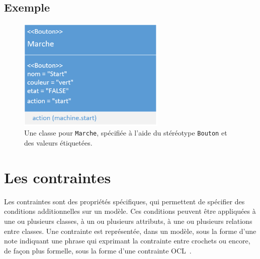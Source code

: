 
\subsection*{Exemple}
%
\begin{figure}[H]
    \begin{center}
    \includegraphics[width=7cm]{10_img/chap4/start.PNG}
    \caption{Une classe pour \texttt{Marche}, spécifiée à l'aide du stéréotype \texttt{Bouton} et des valeurs \'etiquet\'ees.}
    \label{fig.uml_marche}
    \end{center}
\end{figure}






\section{Les contraintes}
Les contraintes sont des propriétés spécifiques, qui permettent de sp\'ecifier des conditions additionnelles sur un modèle.
Ces conditions peuvent être appliquées à une ou plusieurs classes, à un ou plusieurs attributs, à une ou plusieurs relations entre classes.
Une contrainte est représent\'ee, dans un modèle, sous la forme d'une note indiquant une phrase qui exprimant la contrainte entre crochets ou encore, de fa\c{c}on plus formelle, sous la forme d'une contrainte OCL~\cite{OCL}.

